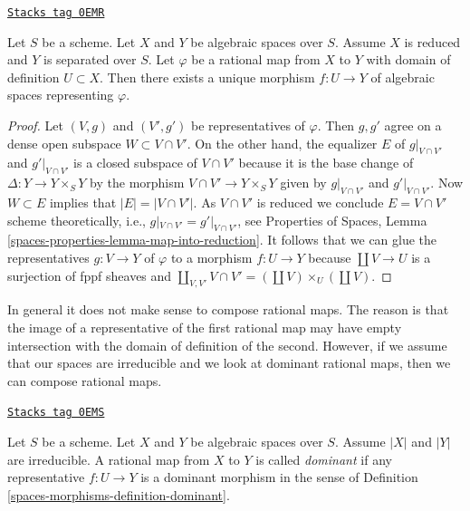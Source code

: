 \begin{lemma}
\label{spaces-morphisms-lemma-rational-map-from-reduced-to-separated}
\href{https://stacks.math.columbia.edu/tag/0EMR}{\texttt{Stacks tag 0EMR}}

Let $S$ be a scheme. Let $X$ and $Y$ be algebraic spaces over $S$.
Assume $X$ is reduced and $Y$ is separated over $S$. Let
$\varphi$ be a rational map from $X$ to $Y$ with domain of definition
$U \subset X$. Then there exists a unique morphism $f : U \to Y$
of algebraic spaces representing $\varphi$.
\end{lemma}

\begin{proof}
Let $(V, g)$ and $(V', g')$ be representatives of $\varphi$. Then
$g, g'$ agree on a dense open subspace $W \subset V \cap V'$.
On the other hand, the equalizer $E$ of $g|_{V \cap V'}$ and $g'|_{V \cap V'}$
is a closed subspace of $V \cap V'$ because it is the base change
of $\Delta : Y \to Y \times_S Y$ by the morphism
$V \cap V' \to Y \times_S Y$ given by $g|_{V \cap V'}$ and $g'|_{V \cap V'}$.
Now $W \subset E$ implies that $|E| = |V \cap V'|$. As $V \cap V'$
is reduced we conclude $E = V \cap V'$ scheme theoretically, i.e.,
$g|_{V \cap V'} = g'|_{V \cap V'}$, see
Properties of Spaces, Lemma \ref{spaces-properties-lemma-map-into-reduction}.
It follows that we can glue the representatives $g : V \to Y$ of $\varphi$
to a morphism $f : U \to Y$ because $\coprod V \to U$ is a surjection of
fppf sheaves and
$\coprod_{V, V'} V \cap V' = (\coprod V) \times_U (\coprod V)$.
\end{proof}

In general it does not make sense to compose rational maps. The reason
is that the image of a representative of the first rational map may
have empty intersection with the domain of definition of the second.
However, if we assume that our spaces are irreducible and we look
at dominant rational maps, then we can compose rational maps.

\begin{definition}
\label{spaces-morphisms-definition-dominant-rational}
\href{https://stacks.math.columbia.edu/tag/0EMS}{\texttt{Stacks tag 0EMS}}

Let $S$ be a scheme. Let $X$ and $Y$ be algebraic spaces over $S$.
Assume $|X|$ and $|Y|$ are irreducible. A rational map from $X$ to $Y$
is called {\it dominant} if any representative $f : U \to Y$ is a dominant
morphism in the sense of Definition \ref{spaces-morphisms-definition-dominant}.
\end{definition}

